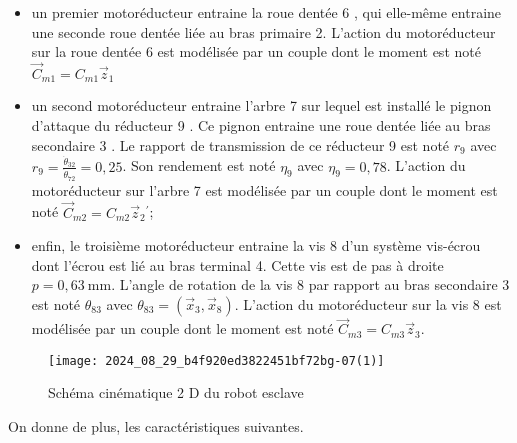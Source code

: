 \begin{itemize}
  \item un premier motoréducteur entraine la roue dentée 6 , qui elle-même entraine une seconde roue dentée liée au bras primaire 2. L'action du motoréducteur sur la roue dentée 6 est modélisée par un couple dont le moment est noté $\vec{C}_{m 1}=C_{m 1} \vec{z}_{1}$
  \item un second motoréducteur entraine l'arbre 7 sur lequel est installé le pignon d'attaque du réducteur 9 . Ce pignon entraine une roue dentée liée au bras secondaire 3 . Le rapport de transmission de ce réducteur 9 est noté $r_{9}$ avec $r_{9}=\frac{\dot{\theta}_{32}}{\dot{\theta}_{72}}=0,25$. Son rendement est noté $\eta_{9}$ avec $\eta_{9}=0,78$. L'action du motoréducteur sur l'arbre 7 est modélisée par un couple dont le moment est noté $\vec{C}_{m 2}=C_{m 2} \vec{z}_{2}{ }^{\prime}$;
  \item enfin, le troisième motoréducteur entraine la vis 8 d'un système vis-écrou dont l'écrou est lié au bras terminal 4. Cette vis est de pas à droite $p=0,63 \mathrm{~mm}$. L'angle de rotation de la vis 8 par rapport au bras secondaire 3 est noté $\theta_{83}$ avec $\theta_{83}=\left(\vec{x}_{3}, \vec{x}_{8}\right)$. L'action du motoréducteur sur la vis 8 est modélisée par un couple dont le moment est noté $\vec{C}_{m 3}=C_{m 3} \vec{z}_{3}$.
\end{itemize}


\begin{figure}[!h]
\centering
\texttt{[image: 2024\_08\_29\_b4f920ed3822451bf72bg-07(1)]}
\caption{\label{fig_07} Schéma cinématique 2 D du robot esclave}
\end{figure}

On donne de plus, les caractéristiques suivantes.

